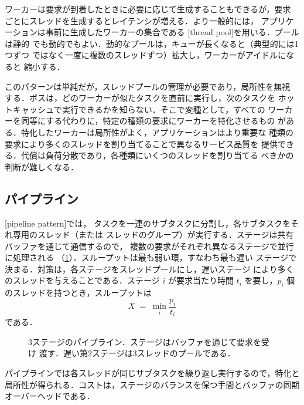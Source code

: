 \documentclass[../main.tex]{subfiles}
\begin{document}
ワーカーは要求が到着したときに必要に応じて生成することもできるが，要求
ごとにスレッドを生成するとレイテンシが増える．より一般的には，
アプリケーションは事前に生成したワーカーの集合である
[thread pool]を用いる．プールは静的
でも動的でもよい．動的なプールは，キューが長くなると（典型的には1つずつ
ではなく一度に複数のスレッドずつ）拡大し，ワーカーがアイドルになると
縮小する．

このパターンは単純だが，スレッドプールの管理が必要であり，局所性を無視
する．ボスは，どのワーカーが似たタスクを直前に実行し，次のタスクを
ホットキャッシュで実行できるかを知らない．そこで変種として，すべての
ワーカーを同等にする代わりに，特定の種類の要求にワーカーを特化させるもの
がある．特化したワーカーは局所性がよく，アプリケーションはより重要な
種類の要求により多くのスレッドを割り当てることで異なるサービス品質を
提供できる．代償は負荷分散であり，各種類にいくつのスレッドを割り当てる
べきかの判断が難しくなる．

\subsection{パイプライン}

[pipeline pattern]では，
タスクを一連のサブタスクに分割し，各サブタスクをそれ専用のスレッド（または
スレッドのグループ）が実行する．ステージは共有バッファを通じて通信するので，
複数の要求がそれぞれ異なるステージで並行に処理される
（\cref{fig:l03-pipeline}）．スループットは最も弱い環，すなわち最も遅い
ステージで決まる．対策は，各ステージをスレッドプールにし，遅いステージ
により多くのスレッドを与えることである．ステージ $i$ が要求当たり時間
$t_i$ を要し，$p_i$ 個のスレッドを持つとき，スループットは
\begin{equation}
  X \;=\; \min_i \frac{p_i}{t_i}
  \label{eq:l03-pipeline-throughput}
\end{equation}
である．

\begin{figure}[htbp]
  \centering
  
  \caption{3ステージのパイプライン．ステージはバッファを通じて要求を受け
    渡す．遅い第2ステージは3スレッドのプールである．}
  \label{fig:l03-pipeline}
\end{figure}
パイプラインでは各スレッドが同じサブタスクを繰り返し実行するので，特化と
局所性が得られる．コストは，ステージのバランスを保つ手間とバッファの同期
オーバーヘッドである．
\end{document}
